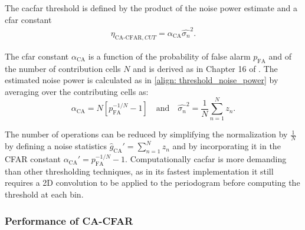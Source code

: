 
The \gls{cacfar} threshold is defined by the product of the noise power estimate and a \gls{cfar} constant
\begin{align}
	\eta_{\text{CA-CFAR},CUT} = \alpha_{\text{CA}} \hat{\sigma_n}^2.
\end{align}

The \gls{cfar} constant $\alpha_{\text{CA}}$ is a function of the probability of false alarm $p_{\text{FA}}$ and of the number of contribution cells $N$ and is derived as in Chapter 16 of \cite{Richards_Scheer_Holm_2010}. The estimated noise power is calculated as in \eqref{align: threshold_noise_power} by averaging over the contributing cells as:
\begin{equation}
	\alpha_{\text{CA}} = N[p_{\text{FA}}^{-1/N} - 1] \quad \text{and} \quad \hat{\sigma_n}^2 = \frac{1}{N}\sum_{n=1}^N z_n.
\end{equation}

The number of operations can be reduced by simplifying the normalization by $\frac{1}{N}$ by defining a noise statistics $\hat{g}_{\text{CA}}' = \sum_{n=1}^N z_n$ and by incorporating it in the CFAR constant $\alpha_{\text{CA}}' = p_{\text{FA}}^{-1/N} - 1$.
Computationally \gls{cacfar} is more demanding than other thresholding techniques, as in its fastest implementation it still requires a 2D convolution to be applied to the periodogram before computing the threshold at each bin.

\subsubsection{Performance of CA-CFAR}

